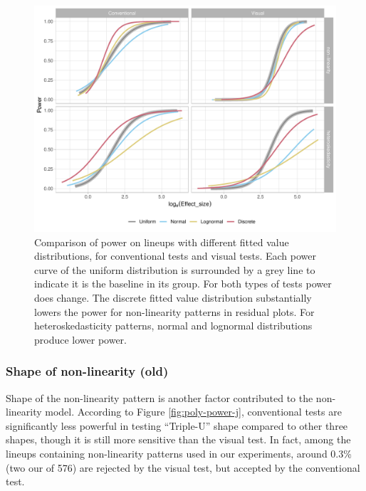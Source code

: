 \documentclass[]{interact}
\theoremstyle{plain}%
\theoremstyle{definition}
\theoremstyle{remark}
\begin{document}
\begin{figure}

{\centering \includegraphics[width=1\linewidth]{paper_comparison_files/figure-latex/different-x-dist-poly-power-1} 

}

\caption{Comparison of power on lineups with different fitted value distributions, for conventional tests and visual tests. Each power curve of the uniform distribution is surrounded by a grey line to indicate it is the baseline in its group. For both types of tests power does change. The discrete fitted value distribution substantially lowers the power for non-linearity patterns in residual plots. For heteroskedasticity patterns, normal and lognormal distributions produce lower power.}\label{fig:different-x-dist-poly-power}
\end{figure}

\hypertarget{shape-of-non-linearity-old}{%
\subsubsection{Shape of non-linearity
(old)}\label{shape-of-non-linearity-old}}

Shape of the non-linearity pattern is another factor contributed to the
non-linearity model. According to Figure \ref{fig:poly-power-j},
conventional tests are significantly less powerful in testing
``Triple-U'' shape compared to other three shapes, though it is still
more sensitive than the visual test. In fact, among the lineups
containing non-linearity patterns used in our experiments, around 0.3\%
(two our of 576) are rejected by the visual test, but accepted by the
conventional test.
\end{document}
